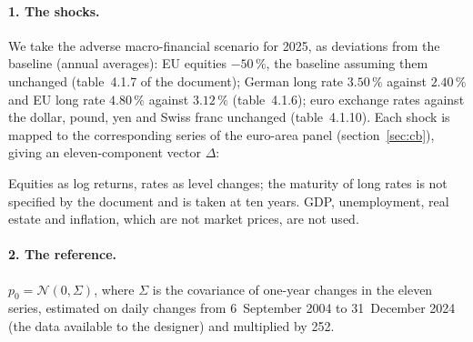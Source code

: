 \documentclass[11pt]{article}
\theoremstyle{definition}
\begin{document}
\paragraph{1. The shocks.} We take the adverse macro-financial scenario
\citep{eba2025} for 2025, as deviations from the baseline (annual averages):
EU equities $-50\,\%$, the baseline assuming them unchanged (table~4.1.7 of
the document); German long rate $3.50\,\%$ against $2.40\,\%$ and EU long
rate $4.80\,\%$ against $3.12\,\%$ (table~4.1.6); euro exchange rates against
the dollar, pound, yen and Swiss franc unchanged (table~4.1.10). Each shock is
mapped to the corresponding series of the euro-area panel
(section~\ref{sec:cb}), giving an eleven-component vector $\Delta$:
\begin{center}
\small
{}
\end{center}
Equities as log returns, rates as level changes; the maturity of long rates is
not specified by the document and is taken at ten years. GDP, unemployment,
real estate and inflation, which are not market prices, are not used.

\paragraph{2. The reference.} $p_0=\mathcal N(0,\Sigma)$, where $\Sigma$ is
the covariance of one-year changes in the eleven series, estimated on daily
changes from 6~September 2004 to 31~December 2024 (the data available to the
designer) and multiplied by 252.
\end{document}
